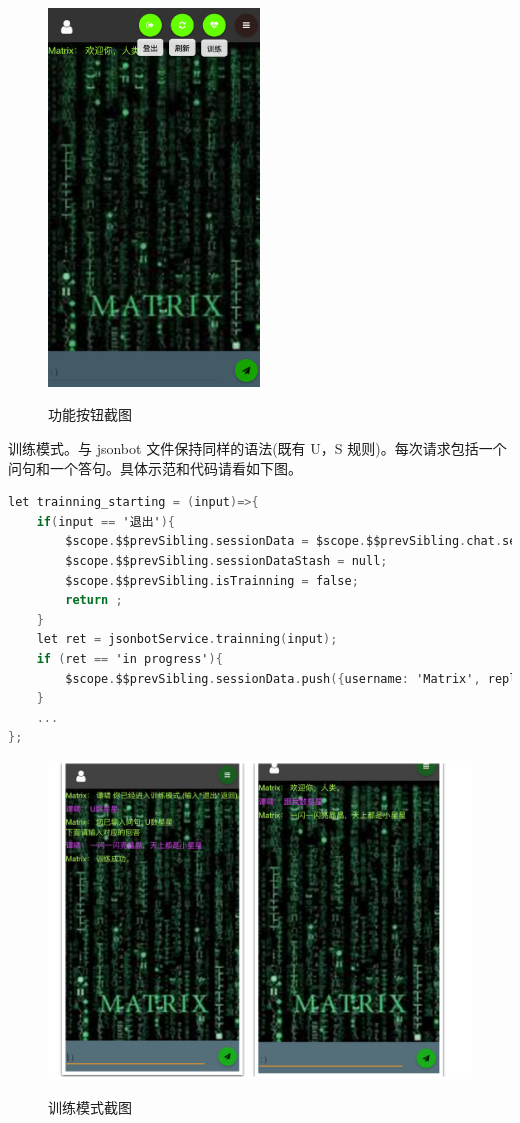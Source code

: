 \documentclass[bachelor,winfonts]{jnuthesis}
\begin{document}
\begin{figure}[H]
  \centering
  \includegraphics[width= 0.5\textwidth]{chat3.png}\\
  \caption{功能按钮截图}\label{fig:pic9}
\end{figure}

训练模式。与 jsonbot 文件保持同样的语法(既有 U，S 规则)。每次请求包括一个问句和一个答句。具体示范和代码请看如下图。
\begin{lstlisting}[language=C]
let trainning_starting = (input)=>{
	if(input == '退出'){
		$scope.$$prevSibling.sessionData = $scope.$$prevSibling.chat.sessionData = $scope.$$prevSibling.sessionDataStash;
		$scope.$$prevSibling.sessionDataStash = null;
		$scope.$$prevSibling.isTrainning = false;
		return ;
	}
	let ret = jsonbotService.trainning(input);
	if (ret == 'in progress'){
		$scope.$$prevSibling.sessionData.push({username: 'Matrix', reply: '您已输入问句: '+ input +'\n下面请输入对应的回答'});
	}
    ...
};
\end{lstlisting}
\begin{figure}[H]
  \centering
  \includegraphics[width= 1.0\textwidth]{train.png}\\
  \caption{训练模式截图}\label{fig:pic9}
\end{figure}
\end{document}
